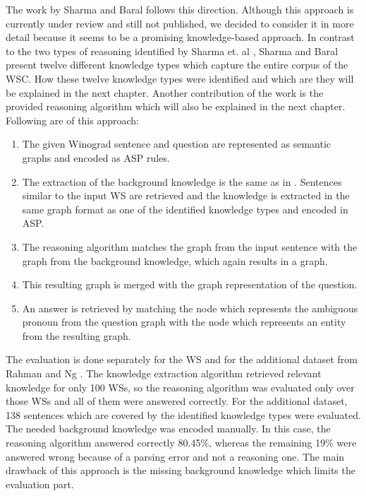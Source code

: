 The work by Sharma and Baral \cite{2018CommonsenseKT} follows this direction. Although this approach is currently under review and still not published, we decided to consider it in more detail because it seems to be a promising knowledge-based approach. In contrast to the two types of reasoning identified by Sharma et. al \cite{DBLP:conf/ijcai/SharmaVAB15}, Sharma and Baral \cite{2018CommonsenseKT} present twelve different knowledge types which capture the entire corpus of the WSC. How these twelve knowledge types were identified and which are they will be explained in the next chapter. Another contribution of the work is the provided reasoning algorithm which will also be explained in the next chapter. \\ Following are  of this approach: 
\begin{enumerate}
	\item The given Winograd sentence and question are represented as semantic graphs and encoded as ASP rules.
	\item The extraction of the background knowledge is the same as in \cite{DBLP:conf/ijcai/SharmaVAB15}. Sentences similar to the input WS are retrieved and the knowledge is extracted in the same graph format as one of the identified knowledge types and encoded in ASP.
	\item The reasoning algorithm matches the graph from the input sentence with the graph from the background knowledge, which again results in a graph.
	\item This resulting graph is merged with the graph representation of the question.
	\item An answer is retrieved by matching the node which represents the ambiguous pronoun from the question graph with the node which represents an entity from the resulting graph.
\end{enumerate}

The evaluation is done separately for the WS and for the additional dataset from Rahman and Ng \cite{DBLP:conf/emnlp/RahmanN12}. The knowledge extraction algorithm retrieved relevant knowledge for only 100 WSs, so the reasoning algorithm was evaluated only over those WSs and all of them were answered correctly. 
For the additional dataset, 138 sentences which are covered by the identified knowledge types were evaluated. The needed background knowledge was encoded manually. In this case, the reasoning algorithm answered correctly 80.45\%, whereas the remaining 19\% were answered wrong because of a parsing error and not a reasoning one. The main drawback of this approach is the missing background knowledge which limits the evaluation part. 
 
